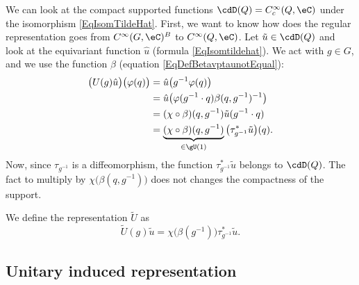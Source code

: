 We can look at the compact supported functions $\cdD(Q)= C^{\infty}_c(Q,\eC)$ under the isomorphism \eqref{EqIsomTildeHat}.  First, we want to know how does the regular representation goes from $ C^{\infty}(G,\eC)^B$ to $ C^{\infty}(Q,\eC)$. Let $\tilde u\in\cdD(Q)$ and look at the equivariant function $\hat u$ (formula \eqref{EqIsomtildehat}). We act with $g\in G$, and we use the function $\beta$ (equation \eqref{EqDefBetavptaunotEqual}):
\begin{equation}
	\begin{aligned}[]
		\big( U(g)\hat u \big)\big( \varphi(q) \big) & =\hat u\big( g^{-1}\varphi(q) \big)                                                          \\
		                                             & =\hat u\big( \varphi(g^{-1}\cdot q)\beta(q,g^{-1})^{-1} \big)                                \\
		                                             & =(\chi\circ\beta)(q,g^{-1})\tilde u(g^{-1}\cdot q)                                           \\
		                                             & =\underbrace{(\chi\circ\beta)(q,g^{-1})}_{\in \gU(1)}\big( \tau_{g^{-1}}^*\tilde u \big)(q).
	\end{aligned}
\end{equation}
Now, since $\tau_{g^{-1}}$ is a diffeomorphism, the function $\tau_{g^{-1}}^*\tilde u$ belongs to $\cdD(Q)$. The fact to multiply by $\chi\big( \beta(q,g^{-1}) \big)$ does not changes the compactness of the support.

We define the representation $\tilde U$ as
\begin{equation}
	\tilde U(g)\tilde u=\chi\big( \beta(g^{-1}) \big)\tau_{g^{-1}}^*\tilde u.
\end{equation}

\subsection{Unitary induced representation}
\label{SubSecUnitInducedPrep}


